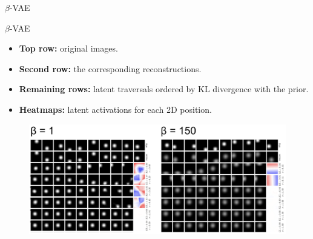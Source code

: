 \begin{frame}{$\beta$-VAE}
\begin{minipage}[t]{0.5\columnwidth}
\begin{figure}[h]
		\end{figure}
	\end{minipage}

\end{frame}
\begin{frame}{$\beta$-VAE}
	\begin{itemize}
		\item \textbf{Top row:} original images.
		\item \textbf{Second row:} the corresponding reconstructions. 
		\item \textbf{Remaining rows:} latent traversals ordered by KL divergence with the prior. 
		\item \textbf{Heatmaps:} latent activations for each 2D position.
	\end{itemize}
	\begin{figure}
	    \centering
	    \includegraphics[width=\linewidth]{figs/betaVAE_6.png}
	\end{figure}
\end{frame}
